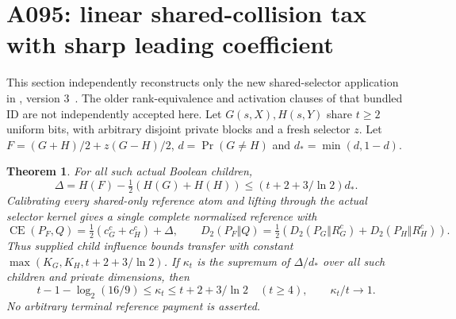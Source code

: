 \documentclass[11pt]{article}
\newtheorem{theorem}[lemma]{Theorem}
\newcommand{\CE}{\operatorname{CE}}
\begin{document}
\section{A095: linear shared-collision tax with sharp leading coefficient}
\label{sec:lineartax}
This section independently reconstructs only the new shared-selector
application in , version 3~\cite{A095d}.
The older rank-equivalence and activation clauses of that bundled ID are
not independently accepted here. Let $G(s,X),H(s,Y)$ share $t\ge2$
uniform bits, with arbitrary disjoint private blocks and a fresh selector $z$.
Let $F=(G+H)/2+z(G-H)/2$, $d=\Pr(G\ne H)$ and $d_* =\min(d,1-d)$.
\begin{theorem}\label{thm:lineartax}
For all such actual Boolean children,
\[
 \Delta=H(F)-\tfrac12(H(G)+H(H))
 \le (t+2+3/\ln2)d_*.
\]
Calibrating every shared-only reference atom and lifting through the
actual selector kernel gives a single complete normalized reference with
\[
 \CE(P_F,Q)=\tfrac12(c_G^c+c_H^c)+\Delta,
 \qquad D_2(P_F\Vert Q)=\tfrac12(D_2(P_G\Vert R_G^c)+D_2(P_H\Vert R_H^c)).
\]
Thus supplied child influence bounds transfer with constant
$\max(K_G,K_H,t+2+3/\ln2)$. If $\kappa_t$ is the supremum of
$\Delta/d_*$ over all such children and private dimensions, then
\[
 t-1-\log_2(16/9)\le\kappa_t\le t+2+3/\ln2\quad(t\ge4),
 \qquad \kappa_t/t\longrightarrow1.
\]
No arbitrary terminal reference payment is asserted.
\end{theorem}
\end{document}
